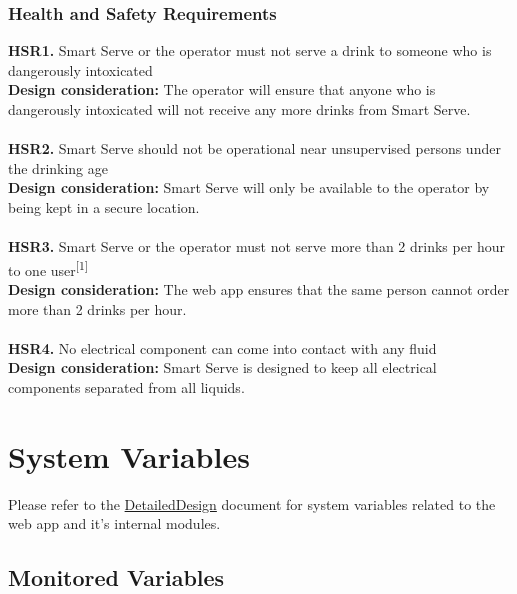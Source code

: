\documentclass[12pt, titlepage]{article}
\begin{document}
\subsubsection{Health and Safety Requirements}
    \noindent\textbf{HSR1.} Smart Serve or the operator must not serve a drink to someone who is dangerously intoxicated \\
    \indent\textbf{Design consideration:} The operator will ensure that anyone who is dangerously intoxicated will not receive any more drinks from Smart Serve.\\\\
    \textbf{HSR2.} Smart Serve should not be operational near unsupervised persons under the drinking age \\
    \indent\textbf{Design consideration:} Smart Serve will only be available to the operator by being kept in a secure location.\\\\
    \textbf{HSR3.} Smart Serve or the operator must not serve more than 2 drinks per hour to one user\textsuperscript{[1]} \\
    \indent\textbf{Design consideration:} The web app ensures that the same person cannot order more than 2 drinks per hour.\\\\
    \textbf{HSR4.} No electrical component can come into contact with any fluid \\
    \indent\textbf{Design consideration:} Smart Serve is designed to keep all electrical components separated from all liquids.


 \section{System Variables}
Please refer to the \href{https://github.com/purefisher/Smart-Serve/blob/main/docs/Design/DetailedDesign.pdf}{DetailedDesign} document for system variables related to the web app and it's internal modules.

\subsection{Monitored Variables}
\end{document}
